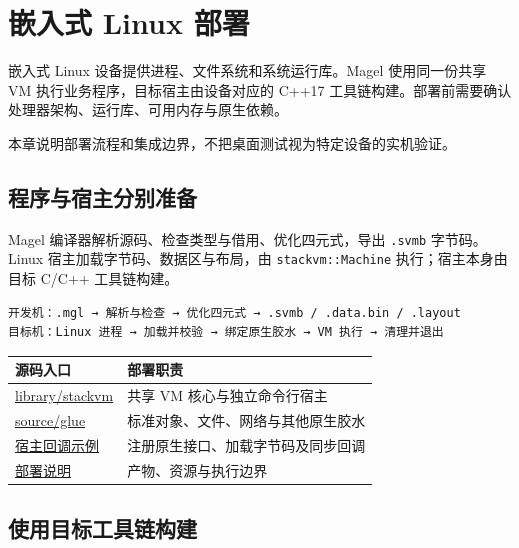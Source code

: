 \chapter{嵌入式 Linux 部署}
\label{ch:25}

嵌入式 Linux 设备提供进程、文件系统和系统运行库。Magel 使用同一份共享 VM 执行业务程序，目标宿主由设备对应的 C++17 工具链构建。部署前需要确认处理器架构、运行库、可用内存与原生依赖。

本章说明部署流程和集成边界，不把桌面测试视为特定设备的实机验证。

\section{程序与宿主分别准备}

Magel 编译器解析源码、检查类型与借用、优化四元式，导出 \texttt{.\allowbreak{}svmb} 字节码。Linux 宿主加载字节码、数据区与布局，由 \texttt{stackvm:\allowbreak{}:\allowbreak{}Machine} 执行；宿主本身由目标 C/C++ 工具链构建。

\par
\medskip
\begin{lstlisting}[style=out]
开发机：.mgl → 解析与检查 → 优化四元式 → .svmb / .data.bin / .layout
目标机：Linux 进程 → 加载并校验 → 绑定原生胶水 → VM 执行 → 清理并退出
\end{lstlisting}
\par
\medskip

{\small\setlength{\tabcolsep}{4pt}
\begin{longtable}{>{\raggedright\arraybackslash}p{}>{\raggedright\arraybackslash}p{}}
\toprule
源码入口 & 部署职责 \\
\midrule
\endhead
\href{https://github.com/rabbitc999/Magel/tree/master/library/stackvm}{library/stackvm} & 共享 VM 核心与独立命令行宿主 \\
\href{https://github.com/rabbitc999/Magel/tree/master/source/glue}{source/glue} & 标准对象、文件、网络与其他原生胶水 \\
\href{https://github.com/rabbitc999/Magel/blob/master/example/native-callbacks/README.md}{宿主回调示例} & 注册原生接口、加载字节码及同步回调 \\
\href{https://github.com/rabbitc999/Magel/blob/master/doc/06-deployment.md}{部署说明} & 产物、资源与执行边界 \\
\bottomrule
\end{longtable}
}

\section{使用目标工具链构建}

